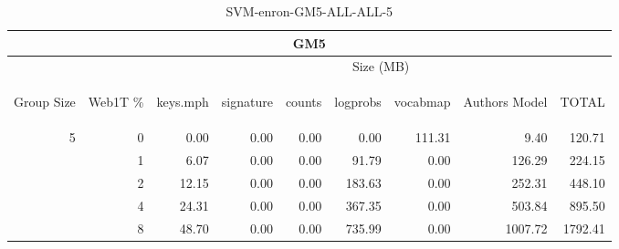 \begin{center}
\begin{table}[htbp] 
 \begin{center}
\begin{tabular}{ | r | r | r | r | r | r | r | r | r |}
\hline
\multicolumn{9}{|c|}{GM5}\\
\hline
 & & \multicolumn{7}{|c|}{Size (MB)}\\ \cline{3-9}
\begin{sideways}Group Size\end{sideways} & \begin{sideways}Web1T \% \end{sideways} & \begin{sideways}keys.mph\end{sideways} & \begin{sideways}signature\end{sideways} & \begin{sideways}counts\end{sideways} & \begin{sideways}logprobs\end{sideways} & \begin{sideways}vocabmap\end{sideways} & \begin{sideways}Authors Model \end{sideways} & \begin{sideways}TOTAL\end{sideways}\\
\hline
\multirow{4}{*}{5}
 & 0 & 0.00 & 0.00 & 0.00 & 0.00 & 111.31 & 9.40 & 120.71\\ \cline{2-9}
 & 1 & 6.07 & 0.00 & 0.00 & 91.79 & 0.00 & 126.29 & 224.15\\ \cline{2-9}
 & 2 & 12.15 & 0.00 & 0.00 & 183.63 & 0.00 & 252.31 & 448.10\\ \cline{2-9}
 & 4 & 24.31 & 0.00 & 0.00 & 367.35 & 0.00 & 503.84 & 895.50\\ \cline{2-9}
 & 8 & 48.70 & 0.00 & 0.00 & 735.99 & 0.00 & 1007.72 & 1792.41\\ \cline{2-9}
\hline
\end{tabular}
\caption{SVM-enron-GM5-ALL-ALL-5}
\label{table:SVM-enron-GM5-ALL-ALL-5}
\end{center}
 \end{table}
\end{center}

